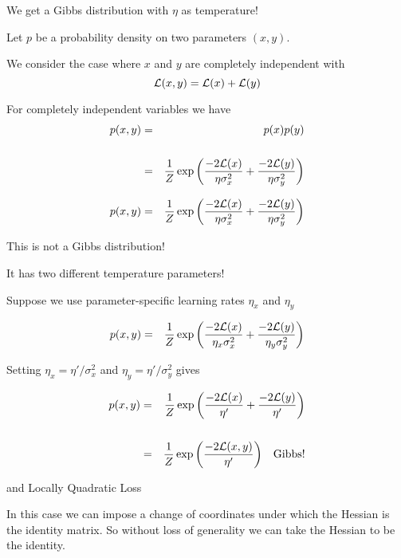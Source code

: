 {\vfill
We get a Gibbs distribution with $\eta$ as temperature!


Let $p$ be a probability density on two parameters $(x,y)$.

\vfill
We consider the case where $x$ and $y$ are completely independent with
$${\cal L}(x,y) = {\cal L}(x) + {\cal L}(y)$$

\vfill
For completely independent variables we have
\begin{eqnarray*}
p(x,y) & = & p(x)p(y) \\
\\
&= & \frac{1}{Z} \exp\left(\frac{-2{\cal L}(x)}{ \eta \sigma_x^2} + \frac{-2{\cal L}(y)}{\eta \sigma_y^2}\right)
\end{eqnarray*}


\begin{eqnarray*}
p(x,y) & = & \frac{1}{Z} \exp\left(\frac{-2{\cal L}(x)}{ \eta \sigma_x^2} + \frac{-2{\cal L}(y)}{\eta \sigma_y^2}\right)
\end{eqnarray*}

\vfill
This is not a Gibbs distribution!

\vfill
It has two different temperature parameters!


Suppose we use parameter-specific learning rates $\eta_x$ and $\eta_y$

\begin{eqnarray*}
p(x,y) & = & \frac{1}{Z} \exp\left(\frac{-2{\cal L}(x)}{ \eta_x \sigma_x^2} + \frac{-2{\cal L}(y)}{\eta_y \sigma_y^2}\right)
\end{eqnarray*}

Setting $\eta_x = \eta'/\sigma^2_x$ and $\eta_y = \eta'/\sigma^2_y$ gives

\begin{eqnarray*}
p(x,y) & = & \frac{1}{Z} \exp\left(\frac{-2{\cal L}(x)}{ \eta'} + \frac{-2{\cal L}(y)}{\eta'}\right) \\
\\
& = & \frac{1}{Z} \exp\left(\frac{-2{\cal L}(x,y)}{\eta'}\right)\;\;\;\mathrm{Gibbs!}
\end{eqnarray*}

{and Locally Quadratic Loss}

In this case we can impose a change of coordinates under which the Hessian is the identity matrix.  So without loss of generality we can take the
Hessian to be the identity.

}

